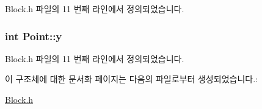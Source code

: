 Block.\+h 파일의 11 번째 라인에서 정의되었습니다.

\subsubsection[{\texorpdfstring{y}{y}}]{\setlength{\rightskip}{0pt plus 5cm}int Point\+::y}\hypertarget{struct_point_a2e1b5fb2b2a83571f5c0bc0f66a73cf7}{}\label{struct_point_a2e1b5fb2b2a83571f5c0bc0f66a73cf7}


Block.\+h 파일의 11 번째 라인에서 정의되었습니다.



이 구조체에 대한 문서화 페이지는 다음의 파일로부터 생성되었습니다.\+:\begin{DoxyCompactItemize}
\item 
\hyperlink{_block_8h}{Block.\+h}\end{DoxyCompactItemize}

